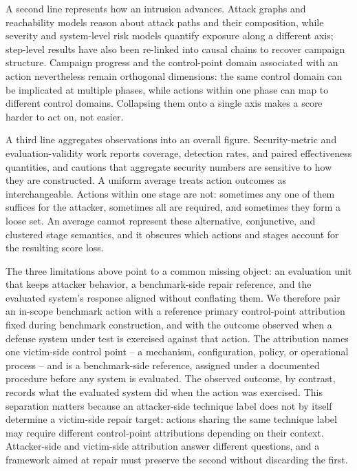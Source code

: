 A second line represents how an intrusion advances. Attack graphs and reachability models
reason about attack paths and their
composition\cite{sheyner2002attackgraphs,wang2007measuring}, while severity and system-level
risk models quantify exposure along a different axis\cite{mell2007common,erola2022system};
step-level results have also been re-linked into causal chains to recover campaign
structure\cite{shen2024decoding}. Campaign progress and the control-point domain associated
with an action nevertheless remain orthogonal dimensions: the same control domain can be
implicated at multiple phases, while actions within one phase can map to different control
domains. Collapsing them onto a single axis makes a score harder to act on, not easier.

A third line aggregates observations into an overall figure. Security-metric and
evaluation-validity work reports coverage, detection rates, and paired effectiveness
quantities\cite{iannacone2020quantifiable,zaffarano2015mtd,liu2023defia}, and cautions that
aggregate security numbers are sensitive to how they are
constructed\cite{verendel2009quantified,vanderkouwe2019benchmarkingflaws}. A uniform average
treats action outcomes as interchangeable. Actions within one stage are not: sometimes any
one of them suffices for the attacker, sometimes all are required, and sometimes they form a
loose set. An average cannot represent these alternative, conjunctive, and clustered stage
semantics, and it obscures which actions and stages account for the resulting score loss.

The three limitations above point to a common missing object: an evaluation unit that keeps
attacker behavior, a benchmark-side repair reference, and the evaluated system's response
aligned without conflating them. We therefore pair an in-scope benchmark action with a
reference primary control-point attribution fixed during benchmark construction, and with the
outcome observed when a defense system under test is exercised against that action. The
attribution names one victim-side control point -- a mechanism, configuration, policy, or
operational process -- and is a benchmark-side reference, assigned under a documented
procedure before any system is evaluated. The observed outcome, by contrast, records what the
evaluated system did when the action was exercised. This separation matters because an
attacker-side technique label does not by itself determine a victim-side repair target:
actions sharing the same technique label may require different control-point attributions
depending on their context. Attacker-side and victim-side attribution answer different
questions, and a framework aimed at repair must preserve the second without discarding the
first.

